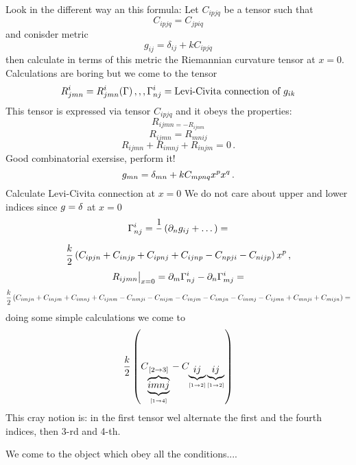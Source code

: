    Look in the different way an this formula:
Let $C_{ipjq}$ be a tensor such that
       $$
     C_{ipjq}=C_{jpiq}
       $$
and conisder metric
        $$
       g_{ij}=\delta_{ij}+k C_{ipjq}
        $$
then calculate in terms of this metric the Riemannian curvature
tensor at $x=0$. Calculations are boring but we come to
the tensor 
      $$
   R^i_{jmn}=R^i_{jmn}(\Gamma)\,,,,\Gamma^i_{nj}=\hbox
  {Levi-Civita connection of $g_{ik}$}
      $$
This tensor  is expressed via tensor $C_{ipjq}$
and it obeys the properties:
      $$
    R_{ijmn=-R_{ijnm}}
      $$
        $$
       R_{ijmn}=R_{mnij}
        $$
        $$
   R_{ijmn}+R_{imnj}+R_{injm}=0\,.
         $$
Good combinatorial exersise, perform it!
    $$
g_{mn}=\delta_{mn}+kC_{mpnq}x^px^q\,.
     $$
 Calculate Levi-Civita connection at $x=0$
We do not care about upper and lower indices since $g=\delta$
at $x=0$
            $$
{\Gamma}_{nj}^i={1\over}\left(\partial_n g_{ij}+\dots\right)=
            $$          
            $$
{k\over 2}\left(C_{ipjn}+C_{injp}+C_{ipnj}+C_{ijnp}
   -C_{npji}-C_{nijp}\right)x^p\,,
            $$
         $$
R_{ijmn}\big\vert_{x=0}=\partial_m{\Gamma}^i_{nj}-\partial_n{\Gamma}^i_{mj}=
        $$
      $$
{k\over 2}\left(C_{imjn}+C_{injm}+C_{imnj}+C_{ijnm}-
               C_{nmji}-C_{nijm}-
                C_{injm}-C_{imjn}-
                C_{inmj}-C_{ijmn}+
                C_{mnji}+C_{mijn}\right)=
      $$
doing some simple calculations  we come to
                $$
{k\over 2}\left(
               C_
{\underbrace
  {\overbrace{imnj}^
  {[2\to 3]}}_{[1\to 4]}}
           -C_
  {\underbrace{ij}_{[1\to 2]}
   \underbrace{ij}_{[1\to 2]}}
         \right)
                $$
This cray notion is:
in the first tensor wel alternate the first and the fourth
indices, then 3-rd and 4-th.

We come to the object which obey all the conditions....


\bye 



